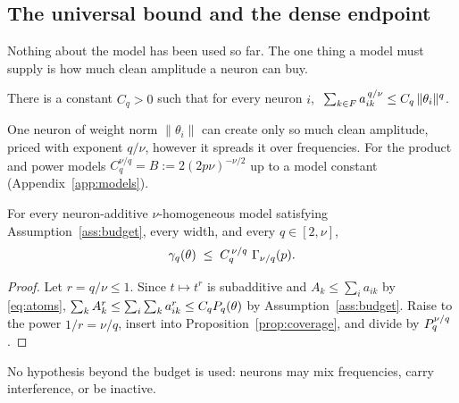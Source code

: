 \subsection{The universal bound and the dense endpoint}
\label{sec:universal}

Nothing about the model has been used so far. The one thing a model must supply is how much clean
amplitude a neuron can buy.

\begin{assumption}[budget]
\label{ass:budget}
There is a constant $C_q>0$ such that for every neuron $i$,
$\ \sum_{k\in F}a_{ik}^{\,q/\nu}\le C_q\,\|\theta_i\|^q$.
\end{assumption}
One neuron of weight norm $\|\theta_i\|$ can create only so much clean amplitude, priced with exponent
$q/\nu$, however it spreads it over frequencies. For the product and power models
$C_q^{\nu/q}=B:=2(2p\nu)^{-\nu/2}$ up to a model constant (Appendix~\ref{app:models}).

\begin{theorem}
\label{thm:universal}
For every neuron-additive $\nu$-homogeneous model satisfying Assumption~\ref{ass:budget}, every
width, and every $q\in[2,\nu]$,
\begin{equation}
  \gam(\theta)\;\le\;C_q^{\,\nu/q}\ \Gam_{\nu/q}(p).
\end{equation}
\end{theorem}
\begin{proof}
Let $r=q/\nu\le 1$. Since $t\mapsto t^r$ is subadditive and $A_k\le\sum_i a_{ik}$ by \eqref{eq:atoms},
$\sum_k A_k^r\le\sum_i\sum_k a_{ik}^r\le C_qP_q(\theta)$ by Assumption~\ref{ass:budget}. Raise to the
power $1/r=\nu/q$, insert into Proposition~\ref{prop:coverage}, and divide by $P_q^{\nu/q}$.
\end{proof}
No hypothesis beyond the budget is used: neurons may mix frequencies, carry interference, or be
inactive.

